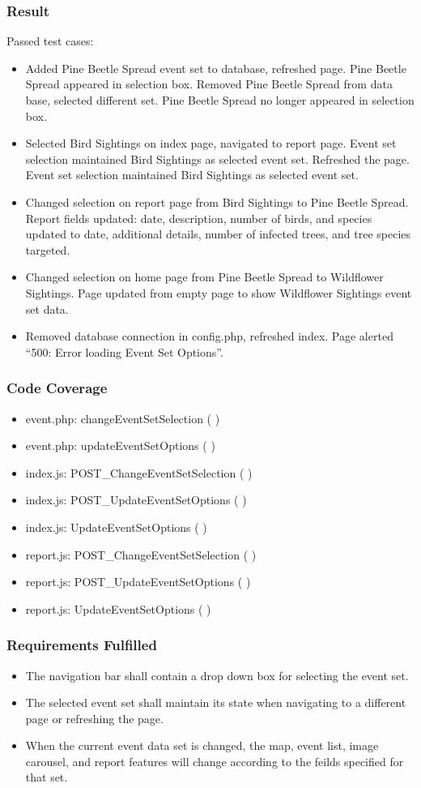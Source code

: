 \subsubsection{Result}
Passed test cases:
\begin{itemize}
\item Added Pine Beetle Spread event set to database, refreshed page. Pine Beetle Spread appeared in selection box. Removed Pine Beetle Spread from data base, selected different set. Pine Beetle Spread no longer appeared in selection box. 
\item Selected Bird Sightings on index page, navigated to report page. Event set selection maintained Bird Sightings as selected event set. Refreshed the page. Event set selection maintained Bird Sightings as selected event set. 
\item Changed selection on report page from Bird Sightings to Pine Beetle Spread. Report fields updated: date, description, number of birds, and species updated to date, additional details, number of infected trees, and tree species targeted. 
\item Changed selection on home page from Pine Beetle Spread to Wildflower Sightings. Page updated from empty page to show Wildflower Sightings event set data.
\item Removed database connection in config.php, refreshed index. Page alerted ``500: Error loading Event Set Options''.
\end{itemize}
\subsubsection{Code Coverage}
\begin{itemize}
\item event.php: changeEventSetSelection ( )
\item event.php: updateEventSetOptions ( )
\item index.js: POST\_ChangeEventSetSelection ( )
\item index.js: POST\_UpdateEventSetOptions ( )
\item index.js: UpdateEventSetOptions ( )
\item report.js: POST\_ChangeEventSetSelection ( )
\item report.js: POST\_UpdateEventSetOptions ( )
\item report.js: UpdateEventSetOptions ( )
\end{itemize}
\subsubsection{Requirements Fulfilled}
\begin{itemize}
\item The navigation bar shall contain a drop down box for selecting the event set.
\item The selected event set shall maintain its state when navigating to a different page or refreshing the page.
\item When the current event data set is changed, the map, event list, image carousel, and report features will change according to the feilds specified for that set.
\end{itemize}

